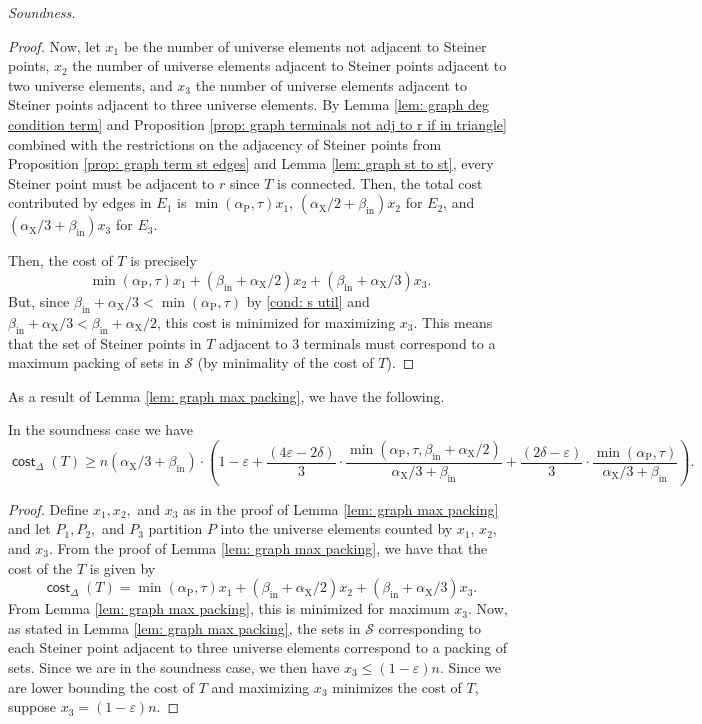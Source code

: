\documentclass{article}\providecommand{\DeclareRedundantLanguages}[2]{}\usepackage[a4paper,margin=20mm]{geometry}
\DeclareMathOperator{\cost}{\mathsf{cost}}
\newcommand{\1}{\textbf{1}}
\newcommand{\td}{\tau}
\newcommand{\srd}{\alpha_{\text{X}}}
\newcommand{\trd}{\alpha_{\text{P}}}
\begin{document}
\begin{paragraph}{\textit{Soundness.}}
\begin{proof}
Now, let $x_1$ be the number of universe elements not adjacent to Steiner points, $x_2$ the number of universe elements adjacent to Steiner points adjacent to two universe elements, and $x_3$ the number of universe elements adjacent to Steiner points adjacent to three universe elements. By Lemma \ref{lem: graph deg condition term} and Proposition \ref{prop: graph terminals not adj to r if in triangle} combined with the restrictions on the adjacency of Steiner points from Proposition \ref{prop: graph term st edges} and Lemma \ref{lem: graph st to st}, every Steiner point must be adjacent to $r$ since $T$ is connected. Then, the total cost contributed by edges in $E_1$ is $\min(\trd, \td)x_1$, $(\srd/2 + \beta_{\text{in}})x_2$ for $E_2$, and $(\srd/3 + \beta_{\text{in}})x_3$ for $E_3$.



Then, the cost of $T$ is precisely 
\[
\min(\trd, \td) x_1  + (\beta_{\text{in}} + \srd/2)x_2 + (\beta_{\text{in}} + \srd/3)x_3.
\]
But, since $\beta_{\text{in}} + \srd/3 < \min(\trd, \td)$
by \ref{cond: s util} and $\beta_{\text{in}} + \srd/3 <\beta_{\text{in}} + \srd/2$,
this cost is minimized for maximizing $x_3$. This means that the set of Steiner points in $T$ adjacent to $3$ terminals must correspond to a maximum packing of sets in $\mathcal{S}$ (by minimality of the cost of $T$).
 \end{proof}
 
 As a result of Lemma \ref{lem: graph max packing}, we have the following.
 \begin{corollary}
 In the soundness case we have
\[
\cost_\Delta(T) \geq n(\srd/3+\beta_{\text{in}})\cdot \left(1 - \varepsilon  + \frac{(4\varepsilon  - 2\delta)}{3} \cdot \frac{\min(\trd, \td, \beta_{\text{in}} + \srd/2)}{\srd/3+\beta_{\text{in}}} + \frac{(2\delta  - \varepsilon)}{3} \cdot \frac{\min(\trd, \td)}{\srd/3+\beta_{\text{in}}} \right).
\]
 \end{corollary}
 \begin{proof}
 Define $x_1, x_2,$ and $x_3$ as in the proof of Lemma \ref{lem: graph max packing} and let $P_1, P_2,$ and $P_3$ partition $P$ into the universe elements counted by $x_1$, $x_2$, and $x_3$.  From the proof of Lemma \ref{lem: graph max packing}, we have that the cost of the $T$ is given by 
 \[
 \cost_{\Delta}(T) = \min(\trd, \td) x_1  + (\beta_{\text{in}} + \srd/2)x_2 + (\beta_{\text{in}} + \srd/3)x_3.
 \]
 From Lemma \ref{lem: graph max packing}, this is minimized for maximum $x_3$. Now, as stated in Lemma \ref{lem: graph max packing}, the sets in $\mathcal{S}$ corresponding to each Steiner point adjacent to three universe elements correspond to a packing of sets. Since we are in the soundness case,  we then have $x_3 \leq (1 - \varepsilon)n$. Since we are lower bounding the cost of $T$ and maximizing $x_3$ minimizes the cost of $T$, suppose  $x_3 = (1 - \varepsilon)n$. 
 

\end{proof}
\end{paragraph}
\end{document}

